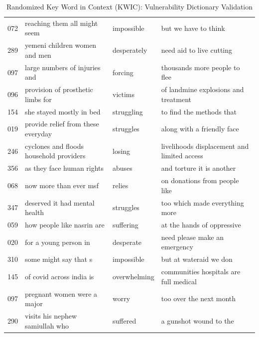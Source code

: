 \begin{table}[ht]
{\begin{tabular}{p{2.5cm}p{5cm}p{2.2cm}p{5cm}}
  072 & reaching them all might seem & impossible & but we have to think \\ 
  289 & yemeni children women and men & desperately & need aid to live cutting \\ 
  097 & large numbers of injuries and & forcing & thousands more people to flee \\ 
  096 & provision of prosthetic limbs for & victims & of landmine explosions and treatment \\ 
  154 & she stayed mostly in bed & struggling & to find the methods that \\ 
  019 & provide relief from these everyday & struggles & along with a friendly face \\ 
  246 & cyclones and floods household providers & losing & livelihoods displacement and limited access \\ 
  356 & as they face human rights & abuses & and torture it is another \\ 
  068 & now more than ever msf & relies & on donations from people like \\ 
  347 & deserved it had mental health & struggles & too which made everything more \\ 
  059 & how people like nasrin are & suffering & at the hands of oppressive \\ 
  020 & for a young person in & desperate & need please make an emergency \\ 
  310 & some might say that s & impossible & but at wateraid we don \\ 
  145 & of covid across india is & overwhelming & communities hospitals are full medical \\ 
  097 & pregnant women were a major & worry & too over the next month \\ 
  290 & visits his nephew samiullah who & suffered & a gunshot wound to the \\ 
   \hline
\end{tabular}
}
\caption{Randomized Key Word in Context (KWIC): Vulnerability Dictionary Validation} 
\end{table}
